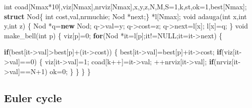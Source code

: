 \documentclass[10pt,]{article}
\newenvironment{Shaded}{}{}
\newcommand{\KeywordTok}[1]{\textcolor[rgb]{0.00,0.44,0.13}{\textbf{{#1}}}}
\newcommand{\DataTypeTok}[1]{\textcolor[rgb]{0.56,0.13,0.00}{{#1}}}
\newcommand{\DecValTok}[1]{\textcolor[rgb]{0.25,0.63,0.44}{{#1}}}
\newcommand{\NormalTok}[1]{{#1}}
\begin{document}
\begin{Shaded}
\begin{Highlighting}[]
\DataTypeTok{int} \NormalTok{coad[Nmax*}\DecValTok{10}\NormalTok{],viz[Nmax],nrviz[Nmax],x,y,z,N,M,S=}\DecValTok{1}\NormalTok{,k,st,ok=}\DecValTok{1}\NormalTok{,best[Nmax];}
\KeywordTok{struct} \NormalTok{Nod\{}
  \DataTypeTok{int} \NormalTok{cost,val,nrmuchie;}
  \NormalTok{Nod *next;\} *l[Nmax];}
\DataTypeTok{void} \NormalTok{adauga(}\DataTypeTok{int} \NormalTok{x,}\DataTypeTok{int} \NormalTok{y,}\DataTypeTok{int} \NormalTok{z)}
\NormalTok{\{}
  \NormalTok{Nod *q=}\KeywordTok{new} \NormalTok{Nod;}
  \NormalTok{q->val=y;}
  \NormalTok{q->cost=z;}
  \NormalTok{q->next=l[x];}
  \NormalTok{l[x]=q;}
\NormalTok{\}}
\DataTypeTok{void} \NormalTok{make_bell(}\DataTypeTok{int} \NormalTok{p)}
\NormalTok{\{}
  \NormalTok{viz[p]=}\DecValTok{0}\NormalTok{;}
  \KeywordTok{for}\NormalTok{(Nod *it=l[p];it!=NULL;it=it->next)}
  \NormalTok{\{}

    \KeywordTok{if}\NormalTok{(best[it->val]>best[p]+(it->cost))}
    \NormalTok{\{}
      \NormalTok{best[it->val]=best[p]+it->cost;}
      \KeywordTok{if}\NormalTok{(viz[it->val]==}\DecValTok{0}\NormalTok{)}
      \NormalTok{\{}
        \NormalTok{viz[it->val]=}\DecValTok{1}\NormalTok{;}
        \NormalTok{coad[k++]=it->val;}
        \NormalTok{++nrviz[it->val];}
        \KeywordTok{if}\NormalTok{(nrviz[it->val]==N}\DecValTok{+1}\NormalTok{)}
          \NormalTok{ok=}\DecValTok{0}\NormalTok{;}
      \NormalTok{\}}
    \NormalTok{\}}
  \NormalTok{\}}
\NormalTok{\}}
\end{Highlighting}
\end{Shaded}

\subsection{Euler cycle}
\end{document}

